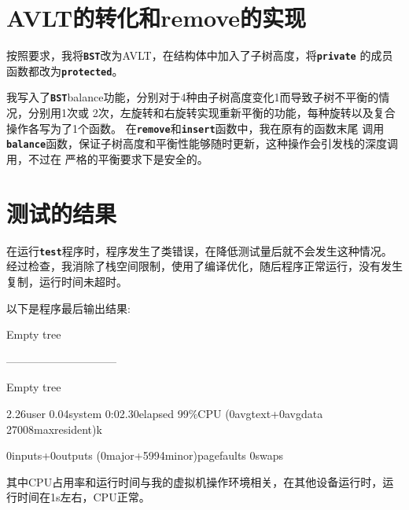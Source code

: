 \documentclass[UTF8]{ctexart}
\begin{document}
\pagestyle{fancy}
\fancyhead{}

\section{AVLT的转化和remove的实现}
按照要求，我将\textbf{\texttt{BST}}改为AVLT，在结构体中加入了子树高度，将\textbf{\texttt{private}}
的成员函数都改为\textbf{\texttt{protected}}。\par
我写入了\textbf{\texttt{BST}}balance功能，分别对于4种由子树高度变化1而导致子树不平衡的情况，分别用1次或
2次，左旋转和右旋转实现重新平衡的功能，每种旋转以及复合操作各写为了1个函数。
在\textbf{\texttt{remove}}和\textbf{\texttt{insert}}函数中，我在原有的函数末尾
调用\textbf{\texttt{balance}}函数，保证子树高度和平衡性能够随时更新，这种操作会引发栈的深度调用，不过在
严格的平衡要求下是安全的。\par
\section{测试的结果}
在运行\textbf{\texttt{test}}程序时，程序发生了类错误，在降低测试量后就不会发生这种情况。
经过检查，我消除了栈空间限制，使用了编译优化，随后程序正常运行，没有发生复制，运行时间未超时。\par
以下是程序最后输出结果:\par
Empty tree\par
------------------------------\par
Empty tree\par
2.26user 0.04system 0:02.30elapsed 99\%CPU (0avgtext+0avgdata 27008maxresident)k \par
0inputs+0outputs (0major+5994minor)pagefaults 0swaps\par
其中CPU占用率和运行时间与我的虚拟机操作环境相关，在其他设备运行时，运行时间在1s左右，CPU正常。
\end{document}
